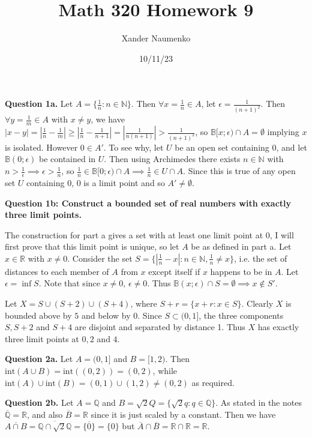 \documentclass[letterpaper, reqno,11pt]{article}
\begin{document}
\title{Math 320 Homework 9}
\date{10/11/23}
\author{Xander Naumenko}
\maketitle

{\medskip\noindent\bf Question 1a.} Let $A=\{\frac{1}{n}:n\in \mathbb{N}\}$. Then $\forall x=\frac{1}{n}\in A$, let $\epsilon=\frac{1}{(n+1)^2}$. Then $\forall y=\frac{1}{m}\in A$ with $x\neq y$, we have $\left| x-y \right| =\left| \frac{1}{n}-\frac{1}{m} \right| \geq \left| \frac{1}{n}-\frac{1}{n+1} \right| =\left| \frac{1}{n(n+1)} \right| >\frac{1}{(n+1)^2}$, so $\mathbb B[x;\epsilon)\cap A=\emptyset$ implying $x$ is isolated. However $0\in A'$. To see why, let $U$ be an open set containing $0$, and let $\mathbb B(0;\epsilon)$ be contained in $U$. Then using Archimedes there exists $n\in \mathbb{N}$ with $n>\frac{1}{\epsilon}\implies \epsilon>\frac{1}{n}$, so $\frac{1}{n}\in \mathbb B[0;\epsilon)\cap A\implies \frac{1}{n}\in U\cap A$. Since this is true of any open set $U$ containing $0$, $0$ is a limit point and so $A'\neq \emptyset$.

{\medskip\noindent\bf Question 1b: Construct a bounded set of real numbers with exactly three limit points.}

The construction for part a gives a set with at least one limit point at $0$, I will first prove that this limit point is unique, so let $A$ be as defined in part a. Let $x\in \mathbb{R}$ with $x\neq 0$. Consider the set $S=\{|\frac{1}{n}-x|: n\in \mathbb{N}, \frac{1}{n}\neq x\}$, i.e. the set of distances to each member of $A$ from $x$ except itself if $x$ happens to be in $A$. Let $\epsilon=\inf S$. Note that since $x\neq 0$, $\epsilon\neq 0$. Thus $\mathbb B(x;\epsilon)\cap S=\emptyset\implies x\notin S'$.

Let $X=S\cup (S+2)\cup (S+4)$, where $S+r=\{x+r: x\in S\}$. Clearly $X$ is bounded above by $5$ and below by $0$. Since $S\subset (0,1]$, the three components $S,S+2$ and $S+4$ are disjoint and separated by distance 1. Thus $X$ has exactly three limit points at $0,2$ and $4$.

\newpage\phantom{blabla}
\newpage

{\medskip\noindent\bf Question 2a.} Let $A=(0,1]$ and $B=[1,2)$. Then $\text{int}(A\cup B)=\text{int}((0,2))=(0,2)$, while $\text{int}(A)\cup \text{int}(B)=(0,1)\cup (1,2)\neq (0,2)$ as required.

{\medskip\noindent\bf Question 2b.} Let $A=\mathbb{Q}$ and $B=\sqrt{2}Q=\{\sqrt{2}q:q\in \mathbb{Q}\}$. As stated in the notes $\overline{\mathbb{Q}}=\mathbb{R}$, and also $\overline{B}=\mathbb{R}$ since it is just scaled by a constant. Then we have $\overline{A\cap B}=\overline{\mathbb{Q}\cap \sqrt{2}\mathbb{Q}}=\overline{\{0\}}=\{0\}$ but $\overline{A}\cap \overline{B}=\mathbb{R}\cap \mathbb{R}=\mathbb{R}$.
\end{document}
